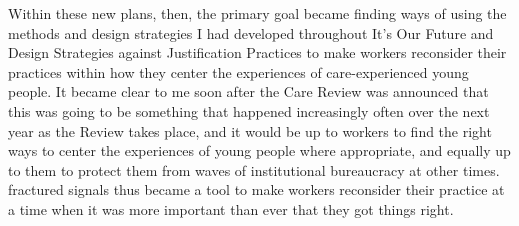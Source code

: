 

Within these new plans, then, the primary goal became finding ways of using the methods and design strategies I had developed throughout It’s Our Future and Design Strategies against Justification Practices to make workers reconsider their practices within how they center the experiences of care-experienced young people. It became clear to me soon after the Care Review was announced that this was going to be something that happened increasingly often over the next year as the Review takes place, and it would be up to workers to find the right ways to center the experiences of young people where appropriate, and equally up to them to protect them from waves of institutional bureaucracy at other times. fractured signals thus became a tool to make workers reconsider their practice at a time when it was more important than ever that they got things right. 

